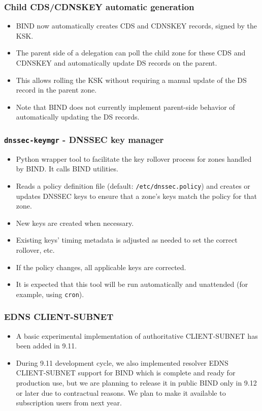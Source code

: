 \documentclass[aspectratio=169,14pt]{beamer}
\begin{document}
\frame
{
  \frametitle{Child CDS/CDNSKEY automatic generation}

  \begin{itemize}

  \item BIND now automatically creates CDS and CDNSKEY records, signed
    by the KSK.

  \item The parent side of a delegation can poll the child zone for
    these CDS and CDNSKEY and automatically update DS records on the
    parent.

  \item This allows rolling the KSK without requiring a manual update of
    the DS record in the parent zone.

  \item Note that BIND does not currently implement parent-side behavior
    of automatically updating the DS records.

  \end{itemize}
}

\frame
{
  \frametitle{\texttt{dnssec-keymgr} - DNSSEC key manager}

  \begin{itemize}

  \item Python wrapper tool to facilitate the key rollover process for
    zones handled by BIND. It calls BIND utilities.

  \item Reads a policy definition file (default:
    \texttt{/etc/dnssec.policy}) and creates or updates DNSSEC keys to
    ensure that a zone's keys match the policy for that zone.

  \item New keys are created when necessary.

  \item Existing keys' timing metadata is adjusted as needed to set the
    correct rollover, etc.

  \item If the policy changes, all applicable keys are corrected.

  \item It is expected that this tool will be run automatically and
    unattended (for example, using \texttt{cron}).

  \end{itemize}
}

\frame
{
  \frametitle{EDNS CLIENT-SUBNET}

  \begin{itemize}

  \item A basic experimental implementation of authoritative
    CLIENT-SUBNET has been added in 9.11.

  \item During 9.11 development cycle, we also implemented resolver EDNS
    CLIENT-SUBNET support for BIND which is complete and ready for
    production use, but we are planning to release it in public BIND
    only in 9.12 or later due to contractual reasons. We plan to make it
    available to subscription users from next year.

  \end{itemize}
}
\end{document}
